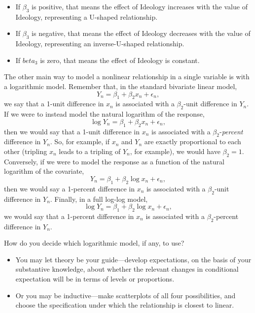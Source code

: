 \documentclass[
  12pt,
  oneside,openany]{book}
\begin{document}
\begin{itemize}
\item
  If \(\beta_3\) is positive, that means the effect of Ideology increases with the value of Ideology, representing a U-shaped relationship.
\item
  If \(\beta_3\) is negative, that means the effect of Ideology decreases with the value of Ideology, representing an inverse-U-shaped relationship.
\item
  If \(beta_3\) is zero, that means the effect of Ideology is constant.
\end{itemize}

The other main way to model a nonlinear relationship in a single variable is with a logarithmic model. Remember that, in the standard bivariate linear model,
\[
Y_n = \beta_1 + \beta_2 x_n + \epsilon_n,
\]
we say that a 1-unit difference in \(x_n\) is associated with a \(\beta_2\)-unit difference in \(Y_n\). If we were to instead model the natural logarithm of the response,
\[
\log Y_n = \beta_1 + \beta_2 x_n + \epsilon_n,
\]
then we would say that a 1-unit difference in \(x_n\) is associated with a \(\beta_2\)-\emph{percent} difference in \(Y_n\). So, for example, if \(x_n\) and \(Y_n\) are exactly proportional to each other (tripling \(x_n\) leads to a tripling of \(Y_n\), for example), we would have \(\beta_2 = 1\). Conversely, if we were to model the response as a function of the natural logarithm of the covariate,
\[
Y_n = \beta_1 + \beta_2 \log x_n + \epsilon_n,
\]
then we would say a 1-percent difference in \(x_n\) is associated with a \(\beta_2\)-unit difference in \(Y_n\). Finally, in a full log-log model,
\[
\log Y_n = \beta_1 + \beta_2 \log x_n + \epsilon_n,
\]
we would say that a 1-percent difference in \(x_n\) is associated with a \(\beta_2\)-percent difference in \(Y_n\).

How do you decide which logarithmic model, if any, to use?

\begin{itemize}
\item
  You may let theory be your guide---develop expectations, on the basis of your substantive knowledge, about whether the relevant changes in conditional expectation will be in terms of levels or proportions.
\item
  Or you may be inductive---make scatterplots of all four possibilities, and choose the specification under which the relationship is closest to linear.
\end{itemize}
\end{document}
